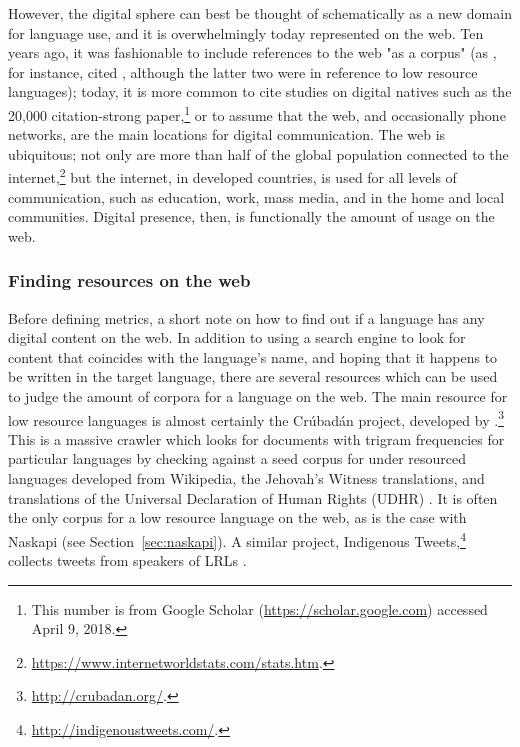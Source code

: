 However, the digital sphere can best be thought of schematically as a new domain for language use, and it is overwhelmingly today represented on the web. Ten years ago, it was fashionable to include references to the web "as a corpus" (as \citet{scannell2007crubadan}, for instance, cited \citet{resnik1999mining, ghani2001mining, kilgarriff2001web}, although the latter two were in reference to low resource languages); today, it is more common to cite studies on digital natives such as the 20,000 citation-strong \citet{prensky2001digital} paper,\footnote{This number is from Google Scholar (\href{https://scholar.google.com}{https://scholar.google.com}) accessed April 9, 2018.} or to assume that the web, and occasionally phone networks, are the main locations for digital communication. The web is ubiquitous; not only are more than half of the global population connected to the internet,\footnote{\href{https://www.internetworldstats.com/stats.htm}{https://www.internetworldstats.com/stats.htm}. } but the internet, in developed countries, is used for all levels of communication, such as education, work, mass media, and in the home and local communities. Digital presence, then, is functionally the amount of usage on the web.

\subsubsection{Finding resources on the web}
\label{subsec:finding-resources}

Before defining metrics, a short note on how to find out if a language has any digital content on the web. In addition to using a search engine to look for content that coincides with the language's name, and hoping that it happens to be written in the target language, there are several resources which can be used to judge the amount of corpora for a language on the web. The main resource for low resource languages is almost certainly the Cr\'ubad\'an project, developed by \citet{scannell2007crubadan}.\footnote{\href{http://crubadan.org/}{http://crubadan.org/}. } This is a massive crawler which looks for documents with trigram frequencies for particular languages by checking against a seed corpus for under resourced languages developed from Wikipedia, the Jehovah's Witness translations, and translations of the Universal Declaration of Human Rights (UDHR) \citep{assembly1948universal}. It is often the only corpus for a low resource language on the web, as is the case with Naskapi (see Section~\ref{sec:naskapi}). A similar project, Indigenous Tweets,\footnote{\href{http://indigenoustweets.com/}{http://indigenoustweets.com/}. } collects tweets from speakers of LRLs \citep{scannell2013endangered}.

